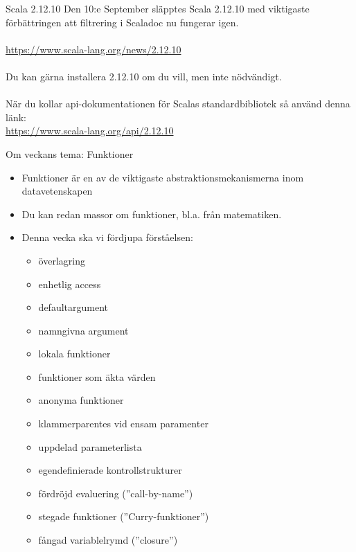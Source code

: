 

\ifkompendium\else
{}

\begin{SlideExtra}{Scala 2.12.10}
  Den 10:e September släpptes Scala 2.12.10 med viktigaste förbättringen att filtrering i Scaladoc nu fungerar igen. 
  \\~\\
  \url{https://www.scala-lang.org/news/2.12.10}
  \\~\\ Du kan gärna installera 2.12.10 om du vill, men inte nödvändigt.
  \\~\\ När du kollar api-dokumentationen för Scalas standardbibliotek så använd denna länk:\\ 
  \url{https://www.scala-lang.org/api/2.12.10}

\end{SlideExtra}
\fi



\ifkompendium\else
\begin{SlideExtra}{Om veckans tema: Funktioner}
\begin{itemize}
  \item Funktioner är en av de viktigaste abstraktionsmekanismerna inom datavetenskapen
  \item Du kan redan massor om funktioner, bl.a. från matematiken.
  \item Denna vecka ska vi fördjupa förståelsen:
  \begin{itemize}
    \item överlagring
    \item enhetlig access
    \item defaultargument
    \item namngivna argument
    \item lokala funktioner
    \item funktioner som äkta värden
    \item anonyma funktioner
    \item klammerparentes vid ensam paramenter
    \item uppdelad parameterlista
    \item egendefinierade kontrollstrukturer
    \item fördröjd evaluering (''call-by-name'')
    \item stegade funktioner (''Curry-funktioner'')
    \item fångad variablelrymd (''closure'')
    \end{itemize}
\end{itemize}  
\end{SlideExtra}

